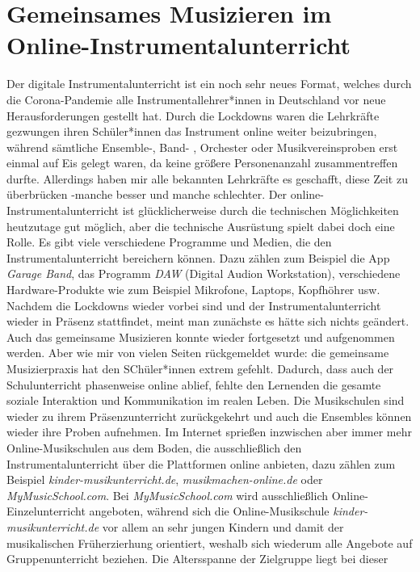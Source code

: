 \section{Gemeinsames Musizieren im Online-Instrumentalunterricht}

Der digitale Instrumentalunterricht ist ein noch sehr neues Format, welches
durch die Corona-Pandemie alle Instrumentallehrer*innen in Deutschland vor neue
Herausforderungen gestellt hat. Durch die Lockdowns waren die Lehrkräfte
gezwungen ihren Schüler*innen das Instrument online weiter beizubringen, während
sämtliche Ensemble-, Band- , Orchester oder Musikvereinsproben erst einmal auf
Eis gelegt waren, da keine größere Personenanzahl zusammentreffen durfte.
Allerdings haben mir alle bekannten Lehrkräfte es geschafft, diese Zeit zu
überbrücken -manche besser und manche schlechter. Der
online-Instrumentalunterricht ist glücklicherweise durch die technischen
Möglichkeiten heutzutage gut möglich, aber die technische Ausrüstung spielt
dabei doch eine Rolle. Es gibt viele verschiedene Programme und Medien, die den
Instrumentalunterricht bereichern können. Dazu zählen zum Beispiel die App
\emph{Garage Band}, das Programm \emph{DAW} (Digital Audion Workstation),
verschiedene Hardware-Produkte wie zum Beispiel Mikrofone, Laptops, Kopfhöhrer
usw. Nachdem die Lockdowns wieder vorbei sind und der Instrumentalunterricht
wieder in Präsenz stattfindet, meint man zunächste es hätte sich nichts
geändert. Auch das gemeinsame Musizieren konnte wieder fortgesetzt und
aufgenommen werden. Aber wie mir von vielen Seiten rückgemeldet wurde: die
gemeinsame Musizierpraxis hat den SChüler*innen extrem gefehlt. Dadurch, dass
auch der Schulunterricht phasenweise online ablief, fehlte den Lernenden die
gesamte soziale Interaktion und Kommunikation im realen Leben. Die Musikschulen
sind wieder zu ihrem Präsenzunterricht zurückgekehrt und auch die Ensembles
können wieder ihre Proben aufnehmen. Im Internet sprießen inzwischen aber immer
mehr Online-Musikschulen aus dem Boden, die ausschließlich den
Instrumentalunterricht über die Plattformen online anbieten, dazu zählen zum
Beispiel \emph{kinder-musikunterricht.de}, \emph{musikmachen-online.de} oder
\emph{MyMusicSchool.com}. Bei \emph{MyMusicSchool.com} wird ausschließlich
Online-Einzelunterricht angeboten, während sich die Online-Musikschule
\emph{kinder-musikunterricht.de} vor allem an sehr jungen Kindern und damit der
musikalischen Früherzierhung orientiert, weshalb sich wiederum alle Angebote auf
Gruppenunterricht beziehen. Die Altersspanne der Zielgruppe liegt bei dieser
